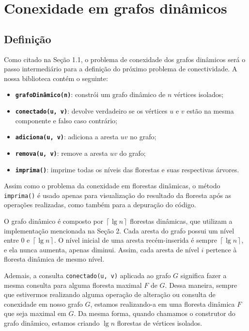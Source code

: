
\chapter{Conexidade em grafos dinâmicos}

\enlargethispage{.8\baselineskip}

\section{Definição}

Como citado na Seção 1.1, o problema de conexidade dos grafos dinâmicos será o passo intermediário para a definição do próximo problema de conectividade. A nossa biblioteca contém o seguinte:

\begin{itemize}
    \item \texttt{\textbf{grafoDinâmico(n)}}: constrói um grafo dinâmico de $n$ vértices isolados;
    \item \texttt{\textbf{conectado(u, v)}}: devolve verdadeiro se os vértices $u$ e $v$ estão na mesma componente e falso caso contrário;
    \item \texttt{\textbf{adiciona(u, v)}}: adiciona a aresta $uv$ no grafo;
    \item \texttt{\textbf{remova(u, v)}}: remove a aresta $uv$ do grafo;
    \item \texttt{\textbf{imprima()}}: imprime todas os níveis das florestas e suas respectivas árvores.
\end{itemize}

Assim como o problema da conexidade em florestas dinâmicas, o método \texttt{imprima()} é usado apenas para visualização do resultado da floresta após as operações realizadas, como também para a depuração do código. 

O grafo dinâmico é composto por $\left\lceil \lg n \right\rceil$ florestas dinâmicas, que utilizam a implementação mencionada na Seção 2. Cada aresta do grafo possui um nível entre $0$ e $\left\lceil \lg n \right\rceil$. O nível inicial de uma aresta recém-inserida é sempre $\left\lceil \lg n \right\rceil$, e ela nunca aumenta, apenas diminui. Assim, cada aresta de nível $i$ pertence à floresta dinâmica de mesmo nível. 

Ademais, a consulta \texttt{conectado(u, v)} aplicada ao grafo $G$ significa fazer a mesma consulta para alguma floresta maximal $F$ de $G$. Dessa maneira, sempre que estivermos realizando alguma operação de alteração ou consulta de conexidade em nosso grafo $G$, estamos realizando-a em uma floresta dinâmica $F$ que seja maximal em $G$. Da mesma forma, quando chamamos o construtor do grafo dinâmico, estamos criando $\lg n$ florestas de vértices isolados.